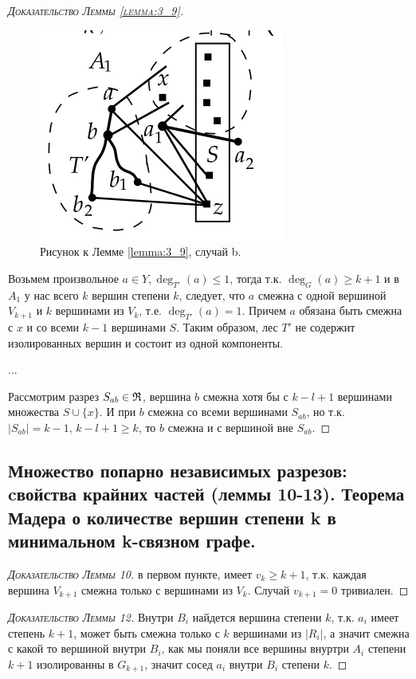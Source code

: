 \begin{proof}[\normalfont\textsc{Доказательство Леммы \ref{lemma:3_9}}]
\begin{figure}[ht]
    \centering
	\includegraphics[width=0.25\columnwidth]{figures/lemma_3_9_b.png}
	\caption{Рисунок к Лемме \ref{lemma:3_9}, случай b.}
    \label{fig:lemma_3_9_b}
\end{figure}

Возьмем произвольное $a \in Y, \deg_{T'}(a) \leqslant 1$, тогда т.к. $\deg_G(a) \geqslant k + 1$ и в $A_1$ у нас всего $k$ вершин степени  $k$, следует, что  $a$ смежна с одной вершиной $V_{k + 1}$ и $k$ вершинами из  $V_{k}$, т.е. $\deg_{T'}(a) = 1$.
Причем $a$ обязана быть смежна с  $x$ и со всеми  $k - 1$ вершинами  $S$.
Таким образом, лес  $T'$ не содержит изолированных вершин и состоит из одной компоненты.

...

Рассмотрим разрез $S_{ab} \in \mathfrak{R}$, вершина $b$ смежна хотя бы с $k - l + 1$ вершинами множества  $S \cup \{x\}$. 
И при $b$ смежна со всеми вершинами  $S_{ab}$, но т.к. $|S_{ab}| = k - 1, \, k - l + 1 \geqslant k$, то $b$ смежна и с вершиной вне  $S_{ab}$.
 

\end{proof}

\subsection{Множество попарно независимых разрезов: cвойства крайних частей (леммы 10-13). Теорема Мадера о количестве вершин степени k в минимальном k-связном графе.}


\begin{proof}[\normalfont\textsc{Доказательство Леммы 10}]
	в первом пункте, имеет $v_k \geqslant k + 1$, т.к. каждая вершина  $V_{k + 1}$ смежна только с вершинами из $V_k$. Случай  $v_{k + 1} = 0$ тривиален.
\end{proof}

\begin{proof}[\normalfont\textsc{Доказательство Леммы 12}]
	Внутри $B_i$ найдется вершина степени  $k$, т.к.  $a_{i}$ имеет степень $k + 1$, может быть смежна только с  $k$ вершинами из $|R_i|$, а значит смежна с какой то вершиной внутри  $B_i$, как мы поняли все вершины внуртри  $A_i$ степени  $k + 1$ изолированны в  $G_{k + 1}$, значит сосед $a_{i}$ внутри $B_i$ степени $k$.
\end{proof}

